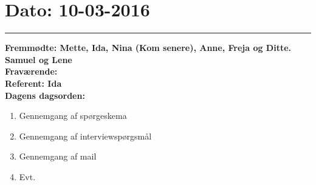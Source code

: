 \section{Dato: 10-03-2016}
\hrule
\textbf{Fremmødte: Mette, Ida, Nina (Kom senere), Anne, Freja og Ditte. Samuel og Lene} \\
\textbf{Fraværende: } \\
\textbf{Referent: Ida } \\
\textbf{Dagens dagsorden: }
\begin{enumerate}
	\item Gennemgang af spørgeskema
	\item Gennemgang af interviewspørgsmål
	\item Gennemgang af mail
	\item Evt. 
\end{enumerate}

